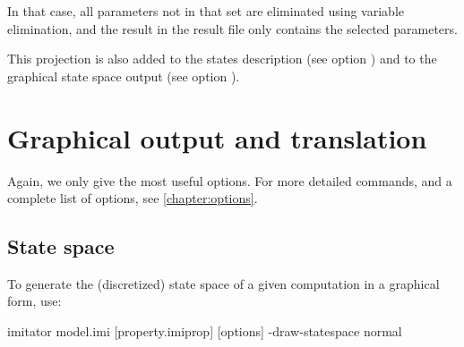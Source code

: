 In that case, all parameters not in that set are eliminated using variable elimination, and the result in the result file only contains the selected parameters.

This projection is also added to the states description (see option ) and to the graphical state space output (see option ).






\chapter{Graphical output and translation}


Again, we only give the most useful options.
For more detailed commands, and a complete list of options, see \cref{chapter:options}.

\section{State space}

To generate the (discretized) state space of a given computation in a graphical form, use:

\begin{terminal}
imitator model.imi [property.imiprop] [options] -draw-statespace normal
\end{terminal}

